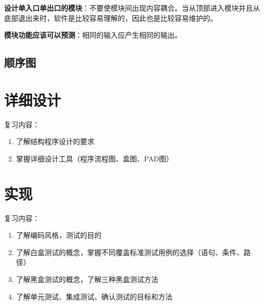 \documentclass[cn, blue, normal, 12pt]{elegantnote}
\begin{document}
\textbf{设计单入口单出口的模块}：不要使模块间出现内容耦合。当从顶部进入模块并且从底部退出来时，软件是比较容易理解的，因此也是比较容易维护的。

\textbf{模块功能应该可以预测}：相同的输入应产生相同的输出。

\subsection{顺序图}



\section{详细设计}

复习内容：

\begin{enumerate}
    \item 了解结构程序设计的要求
    \item 掌握详细设计工具（程序流程图、盒图、PAD图）
\end{enumerate}

\section{实现}

复习内容：

\begin{enumerate}
    \item 了解编码风格，测试的目的
    \item 了解白盒测试的概念，掌握不同覆盖标准测试用例的选择（语句、条件、路径）
    \item 了解黑盒测试的概念，了解三种黑盒测试方法
    \item 了解单元测试、集成测试、确认测试的目标和方法
\end{enumerate}
\end{document}
